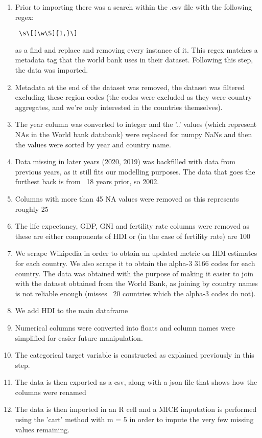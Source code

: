\documentclass[]{article}
\begin{document}
\begin{enumerate}
  \item Prior to importing there was a search within the .csv file with the following regex: \begin{verbatim} \s\[[\w\S]{1,}\] \end{verbatim} as a find and replace and removing every instance of it. This regex matches a metadata tag that the world bank uses in their dataset. Following this step, the data was imported.

  \item Metadata at the end of the dataset was removed, the dataset was filtered excluding these region codes (the codes were excluded as they were country aggregates, and we're only interested in the countries themselves).

  \item The year column was converted to integer and the '..' values (which represent NAs in the World bank databank) were replaced for numpy NaNs and then the values were sorted by year and country name.

  \item Data missing in later years (2020, 2019) was backfilled with data from previous years, as it still fits our modelling purposes. The data that goes the furthest back is from ~18 years prior, so 2002.

  \item Columns with more than 45 NA values were removed as this represents roughly 25%

  \item The life expectancy, GDP, GNI and fertility rate columns were removed as these are either components of HDI or (in the case of fertility rate) are 100%

  \item We scrape Wikipedia in order to obtain an updated metric on HDI estimates for each country. We also scrape it to obtain the alpha-3 3166 codes for each country. The data was obtained with the purpose of making it easier to join with the dataset obtained from the World Bank, as joining by country names is not reliable enough (misses ~20 countries which the alpha-3 codes do not).

  \item We add HDI to the main dataframe

  \item Numerical columns were converted into floats and column names were simplified for easier future manipulation.

  \item The categorical target variable is constructed as explained previously in this step.

  \item The data is then exported as a csv, along with a json file that shows how the columns were renamed

  \item The data is then imported in an R cell and a MICE imputation is performed using the 'cart' method with m = 5 in order to impute the very few missing values remaining.
\end{enumerate}
\end{document}
